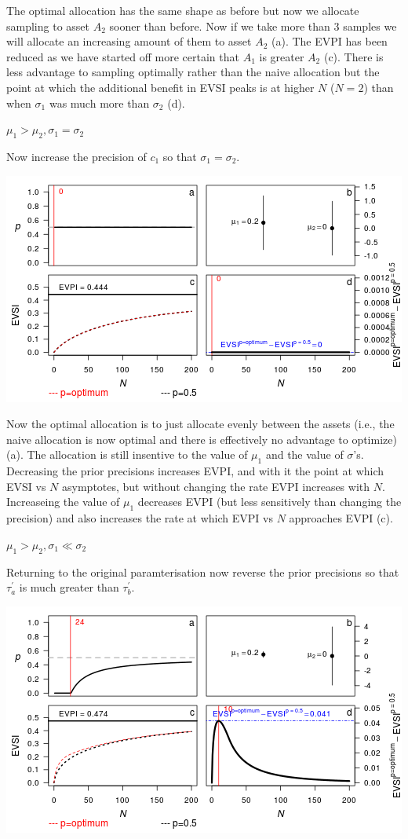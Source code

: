 \documentclass[]{article}
\theoremstyle{definition}
\theoremstyle{definition}
\theoremstyle{remark}
\begin{document}
The optimal allocation has the same shape as before but now we allocate
sampling to asset \(A_2\) sooner than before. Now if we take more than 3
samples we will allocate an increasing amount of them to asset \(A_2\)
(a). The EVPI has been reduced as we have started off more certain that
\(A_1\) is greater \(A_2\) (c). There is less advantage to sampling
optimally rather than the naive allocation but the point at which the
additional benefit in EVSI peaks is at higher \(N\) (\(N=2\)) than when
\(\sigma_1\) was much more than \(\sigma_2\) (d).

\textbf{\(\mu_1 > \mu_2, \sigma_1 = \sigma_2\)}

Now increase the precision of \(c_1\) so that \(\sigma_1 = \sigma_2\).

\includegraphics{figure/unnamed-chunk-6-1.png} \clearpage

Now the optimal allocation is to just allocate evenly between the assets
(i.e., the naive allocation is now optimal and there is effectively no
advantage to optimize) (a). The allocation is still insentive to the
value of \(\mu_1\) and the value of \(\sigma\)'s. Decreasing the prior
precisions increases EVPI, and with it the point at which EVSI vs \(N\)
asymptotes, but without changing the rate EVPI increases with \(N\).
Increaseing the value of \(\mu_1\) decreases EVPI (but less sensitively
than changing the precision) and also increases the rate at which EVPI
vs \(N\) approaches EVPI (c).

\textbf{\(\mu_1 > \mu_2, \sigma_1 \ll \sigma_2\)}

Returning to the original paramterisation now reverse the prior
precisions so that \(\tau^\prime_a\) is much greater than
\(\tau^\prime_b\).

\includegraphics{figure/unnamed-chunk-7-1.png} \clearpage
\end{document}
